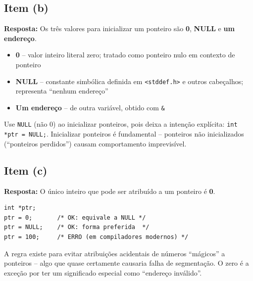 \documentclass[12pt,a4paper]{article}
\begin{document}
\subsection*{Item (b)}
\begin{respostabox}
\textbf{Resposta:} Os três valores para inicializar um ponteiro são
\textcolor{deitelblue}{\textbf{0}}, \textcolor{deitelblue}{\textbf{NULL}} e
\textcolor{deitelblue}{\textbf{um endereço}}.

\begin{itemize}[noitemsep]
  \item \textbf{0} -- valor inteiro literal zero; tratado como ponteiro nulo em contexto de ponteiro
  \item \textbf{NULL} -- constante simbólica definida em \texttt{<stddef.h>} e outros
  cabeçalhos; representa ``nenhum endereço''
  \item \textbf{Um endereço} -- de outra variável, obtido com \texttt{\&}
\end{itemize}

\begin{boaprática}
  Use \texttt{NULL} (não 0) ao inicializar ponteiros, pois deixa a intenção
  explícita: \texttt{int *ptr = NULL;}. Inicializar ponteiros é fundamental --
  ponteiros não inicializados (``ponteiros perdidos'') causam comportamento
  imprevisível.
\end{boaprática}
\end{respostabox}

\subsection*{Item (c)}
\begin{respostabox}
\textbf{Resposta:} O único inteiro que pode ser atribuído a um ponteiro é
\textcolor{deitelblue}{\textbf{0}}.

\begin{lstlisting}
int *ptr;
ptr = 0;       /* OK: equivale a NULL */
ptr = NULL;    /* OK: forma preferida  */
ptr = 100;     /* ERRO (em compiladores modernos) */
\end{lstlisting}

A regra existe para evitar atribuições acidentais de números ``mágicos'' a ponteiros
-- algo que quase certamente causaria falha de segmentação. O zero é a exceção por
ter um significado especial como ``endereço inválido''.
\end{respostabox}

\newpage

\end{document}
